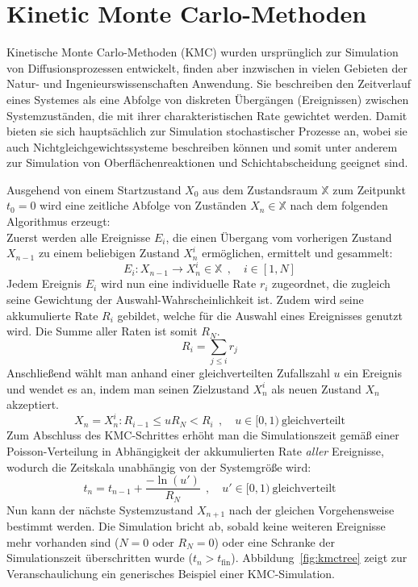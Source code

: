 \section{Kinetic Monte Carlo-Methoden}
\label{kmc}


Kinetische Monte Carlo-Methoden (KMC) wurden ursprünglich zur Simulation von Diffusionsprozessen entwickelt, finden aber inzwischen in vielen Gebieten der Natur- und Ingenieurswissenschaften Anwendung.
Sie beschreiben den Zeitverlauf eines Systemes als eine Abfolge von diskreten Übergängen (Ereignissen) zwischen Systemzuständen, die mit ihrer charakteristischen Rate gewichtet werden.
Damit bieten sie sich hauptsächlich zur Simulation stochastischer Prozesse an, wobei sie auch Nichtgleichgewichtssysteme beschreiben können und somit unter anderem zur Simulation von Oberflächenreaktionen und Schichtabscheidung geeignet sind.

Ausgehend von einem Startzustand $X_0$ aus dem Zustandsraum $\mathbb{X}$ zum Zeitpunkt $t_0 = 0$ wird eine zeitliche Abfolge von Zuständen $X_n \in \mathbb{X}$ nach dem folgenden Algorithmus erzeugt:\\
Zuerst werden alle Ereignisse $E_i$, die einen Übergang vom vorherigen Zustand $X_{n-1}$ zu einem beliebigen Zustand $X_n^i$ ermöglichen, ermittelt und gesammelt:
\begin{equation}
  E_i : X_{n-1} \rightarrow X_n^i \in \mathbb{X} ~~,\quad i \in [1, N]
\end{equation}
Jedem Ereignis $E_i$ wird nun eine individuelle Rate $r_i$ zugeordnet, die zugleich seine Gewichtung der Auswahl-Wahrscheinlichkeit ist.
Zudem wird seine akkumulierte Rate $R_i$ gebildet, welche für die Auswahl eines Ereignisses genutzt wird.
Die Summe aller Raten ist somit $R_N$.
\begin{equation}
  R_i = \sum_{j \le i}{r_j}
\end{equation}
Anschließend wählt man anhand einer gleichverteilten Zufallszahl $u$ ein Ereignis und wendet es an, indem man seinen Zielzustand $X_n^i$ als neuen Zustand $X_n$ akzeptiert.
\begin{equation}
  X_n = X_n^i : R_{i-1} \le u R_N < R_i ~~,\quad u \in [0,1)~\text{gleichverteilt}
\end{equation}
Zum Abschluss des KMC-Schrittes erhöht man die Simulationszeit gemäß einer Poisson-Verteilung in Abhängigkeit der akkumulierten Rate \textit{aller} Ereignisse, wodurch die Zeitskala unabhängig von der Systemgröße wird:
\begin{equation}
  t_n = t_{n-1} + \frac{-\ln(u')}{R_N} ~~,\quad u' \in [0,1)~\text{gleichverteilt}
\end{equation}
Nun kann der nächste Systemzustand $X_{n+1}$ nach der gleichen Vorgehensweise bestimmt werden.
Die Simulation bricht ab, sobald keine weiteren Ereignisse mehr vorhanden sind ($N=0$ oder $R_N=0$) oder eine Schranke der Simulationszeit überschritten wurde ($t_n > t_\text{fin}$).
Abbildung~\ref{fig:kmctree} zeigt zur Veranschaulichung ein generisches Beispiel einer KMC-Simulation.

